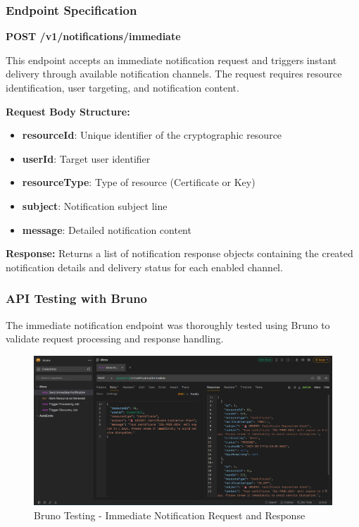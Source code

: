 \subsubsection{Endpoint Specification}

\textbf{POST /v1/notifications/immediate}

This endpoint accepts an immediate notification request and triggers instant delivery through available notification channels. The request requires resource identification, user targeting, and notification content.

\noindent
\textbf{Request Body Structure:}
\begin{itemize}
    \item \textbf{resourceId}: Unique identifier of the cryptographic resource
    \item \textbf{userId}: Target user identifier
    \item \textbf{resourceType}: Type of resource (Certificate or Key)
    \item \textbf{subject}: Notification subject line
    \item \textbf{message}: Detailed notification content
\end{itemize}

\noindent
\textbf{Response:} Returns a list of notification response objects containing the created notification details and delivery status for each enabled channel.

\subsubsection{API Testing with Bruno}

The immediate notification endpoint was thoroughly tested using Bruno to validate request processing and response handling.

\begin{figure}[H]
    \centering
    \includegraphics[width=1\textwidth]{images/bruno_immediate_notification.png}
    \caption{Bruno Testing - Immediate Notification Request and Response}
    \label{fig:bruno_immediate}
\end{figure}


